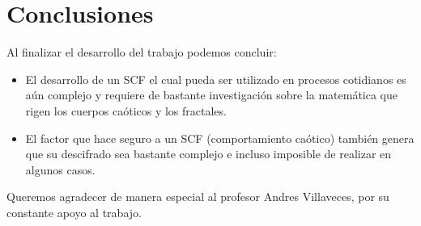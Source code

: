 \section{Conclusiones}

Al finalizar el desarrollo del trabajo podemos concluir:

\begin{itemize}
	\item El desarrollo de un SCF el cual pueda ser utilizado en procesos cotidianos es a\'un complejo y requiere de bastante investigaci\'on sobre la matem\'atica que rigen los cuerpos ca\'oticos y los fractales.
	\item El factor que hace seguro a un SCF (comportamiento ca\'otico) tambi\'en genera que su descifrado sea bastante complejo e incluso imposible de realizar en algunos casos.
\end{itemize}

Queremos agradecer de manera especial al profesor Andres Villaveces, por su constante apoyo al trabajo.
